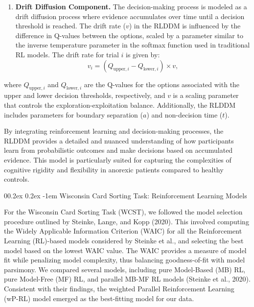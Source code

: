 \documentclass[
  man]{apa6}
\makeatletter
\let\oldparagraph\paragraph
\renewcommand{\paragraph}{
    \@ifstar
      \xxxParagraphStar
      \xxxParagraphNoStar
  }
\newcommand{\xxxParagraphStar}[1]{\oldparagraph*{#1}\mbox{}}
\newcommand{\xxxParagraphNoStar}[1]{\oldparagraph{#1}\mbox{}}
\providecommand{\tightlist}{%
  \setlength{\itemsep}{0pt}\setlength{\parskip}{0pt}}
\renewcommand{\paragraph}{\@startsection{paragraph}{4}{\parindent}%
  {0\baselineskip \@plus 0.2ex \@minus 0.2ex}%
  {-1em}%
  {\normalfont\normalsize\bfseries\itshape\typesectitle}}
\makeatother
\begin{document}
\begin{enumerate}
\def\labelenumi{\arabic{enumi}.}
\setcounter{enumi}{1}
\tightlist
\item
  \textbf{Drift Diffusion Component.} The decision-making process is modeled as a drift diffusion process where evidence accumulates over time until a decision threshold is reached. The drift rate (\(v\)) in the RLDDM is influenced by the difference in Q-values between the options, scaled by a parameter similar to the inverse temperature parameter in the softmax function used in traditional RL models. The drift rate for trial \(i\) is given by:
  \[
    v_i = (Q_{\text{upper},i} - Q_{\text{lower},i}) \times v,
    \]
\end{enumerate}

where \(Q_{\text{upper},i}\) and \(Q_{\text{lower},i}\) are the Q-values for the options associated with the upper and lower decision thresholds, respectively, and \(v\) is a scaling parameter that controls the exploration-exploitation balance. Additionally, the RLDDM includes parameters for boundary separation (\(a\)) and non-decision time (\(t\)).

By integrating reinforcement learning and decision-making processes, the RLDDM provides a detailed and nuanced understanding of how participants learn from probabilistic outcomes and make decisions based on accumulated evidence. This model is particularly suited for capturing the complexities of cognitive rigidity and flexibility in anorexic patients compared to healthy controls.

\paragraph{Wisconsin Card Sorting Task: Reinforcement Learning Models}\label{wisconsin-card-sorting-task-reinforcement-learning-models}

For the Wisconsin Card Sorting Task (WCST), we followed the model selection procedure outlined by Steinke, Lange, and Kopp (2020). This involved computing the Widely Applicable Information Criterion (WAIC) for all the Reinforcement Learning (RL)-based models considered by Steinke et al., and selecting the best model based on the lowest WAIC value. The WAIC provides a measure of model fit while penalizing model complexity, thus balancing goodness-of-fit with model parsimony. We compared several models, including pure Model-Based (MB) RL, pure Model-Free (MF) RL, and parallel MB-MF RL models (Steinke et al., 2020). Consistent with their findings, the weighted Parallel Reinforcement Learning (wP-RL) model emerged as the best-fitting model for our data.
\end{document}
